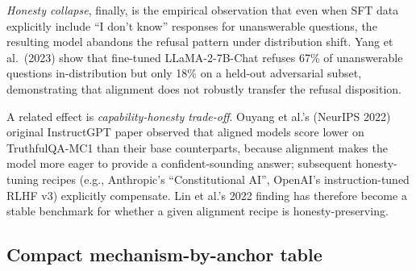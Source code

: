 \emph{Honesty collapse}, finally, is the empirical observation that even when SFT data explicitly include ``I don't know'' responses for unanswerable questions, the resulting model abandons the refusal pattern under distribution shift. Yang et al.~(2023) show that fine-tuned LLaMA-2-7B-Chat refuses 67\% of unanswerable questions in-distribution but only 18\% on a held-out adversarial subset, demonstrating that alignment does not robustly transfer the refusal disposition.

A related effect is \emph{capability-honesty trade-off}. Ouyang et al.'s (NeurIPS 2022) original InstructGPT paper observed that aligned models score lower on TruthfulQA-MC1 than their base counterparts, because alignment makes the model more eager to provide a confident-sounding answer; subsequent honesty-tuning recipes (e.g., Anthropic's ``Constitutional AI'', OpenAI's instruction-tuned RLHF v3) explicitly compensate. Lin et al.'s 2022 finding has therefore become a stable benchmark for whether a given alignment recipe is honesty-preserving.

\subsection{Compact mechanism-by-anchor table}\label{compact-mechanism-by-anchor-table}

